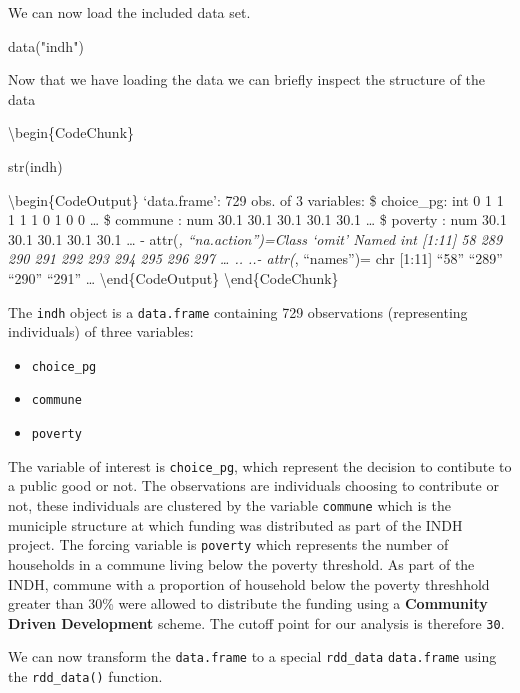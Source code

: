 \documentclass[article]{jss}
\begin{document}
We can now load the included data set.

\begin{CodeChunk}
\begin{CodeInput}
data("indh")
\end{CodeInput}
\end{CodeChunk}

Now that we have loading the data we can briefly inspect the structure
of the data

\textbackslash{}begin\{CodeChunk\}

\begin{CodeInput}
str(indh)
\end{CodeInput}

\textbackslash{}begin\{CodeOutput\} `data.frame': 729 obs. of 3
variables: \$ choice\_pg: int 0 1 1 1 1 1 0 1 0 0 \ldots{} \$ commune :
num 30.1 30.1 30.1 30.1 30.1 \ldots{} \$ poverty : num 30.1 30.1 30.1
30.1 30.1 \ldots{} - attr(\emph{, ``na.action'')=Class `omit' Named int
{[}1:11{]} 58 289 290 291 292 293 294 295 296 297 \ldots{} .. ..-
attr(}, ``names'')= chr {[}1:11{]} ``58'' ``289'' ``290'' ``291''
\ldots{} \textbackslash{}end\{CodeOutput\}
\textbackslash{}end\{CodeChunk\}

The \texttt{indh} object is a \texttt{data.frame} containing 729
observations (representing individuals) of three variables:

\begin{itemize}
\itemsep1pt\parskip0pt
\item
  \texttt{choice\_pg}
\item
  \texttt{commune}
\item
  \texttt{poverty}
\end{itemize}

The variable of interest is \texttt{choice\_pg}, which represent the
decision to contibute to a public good or not. The observations are
individuals choosing to contribute or not, these individuals are
clustered by the variable \texttt{commune} which is the municiple
structure at which funding was distributed as part of the INDH project.
The forcing variable is \texttt{poverty} which represents the number of
households in a commune living below the poverty threshold. As part of
the INDH, commune with a proportion of household below the poverty
threshhold greater than 30\% were allowed to distribute the funding
using a \textbf{Community Driven Development} scheme. The cutoff point
for our analysis is therefore \texttt{30}.

We can now transform the \texttt{data.frame} to a special
\texttt{rdd\_data} \texttt{data.frame} using the \texttt{rdd\_data()}
function.
\end{document}
